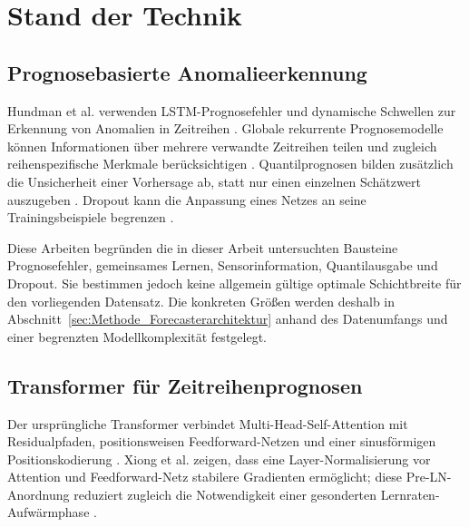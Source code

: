 \chapter{Stand der Technik}
\label{ch:StandDerTechnik}

\section{Prognosebasierte Anomalieerkennung}
\label{sec:SdT_Forecaster}

Hundman et al. verwenden LSTM-Prognosefehler und dynamische Schwellen zur
Erkennung von Anomalien in Zeitreihen \cite{hundman2018spacecraft}. Globale
rekurrente Prognosemodelle können Informationen über mehrere verwandte
Zeitreihen teilen und zugleich reihenspezifische Merkmale berücksichtigen
\cite{salinas2020deepar}. Quantilprognosen bilden zusätzlich die Unsicherheit
einer Vorhersage ab, statt nur einen einzelnen Schätzwert auszugeben
\cite{gasthaus2019spline,koenker1978regression}. Dropout kann die Anpassung
eines Netzes an seine Trainingsbeispiele begrenzen
\cite{srivastava2014dropout}.

Diese Arbeiten begründen die in dieser Arbeit untersuchten Bausteine
Prognosefehler, gemeinsames Lernen, Sensorinformation, Quantilausgabe und
Dropout. Sie bestimmen jedoch keine allgemein gültige optimale Schichtbreite
für den vorliegenden Datensatz. Die konkreten Größen werden deshalb in
Abschnitt~\ref{sec:Methode_Forecasterarchitektur} anhand des Datenumfangs und
einer begrenzten Modellkomplexität festgelegt.

\section{Transformer für Zeitreihenprognosen}
\label{sec:SdT_Transformer}

Der ursprüngliche Transformer verbindet Multi-Head-Self-Attention mit
Residualpfaden, positionsweisen Feedforward-Netzen und einer sinusförmigen
Positionskodierung \cite{vaswani2017attention}. Xiong et al. zeigen, dass eine
Layer-Normalisierung vor Attention und Feedforward-Netz stabilere Gradienten
ermöglicht; diese Pre-LN-Anordnung reduziert zugleich die Notwendigkeit einer
gesonderten Lernraten-Aufwärmphase \cite{xiong2020layernorm}.

